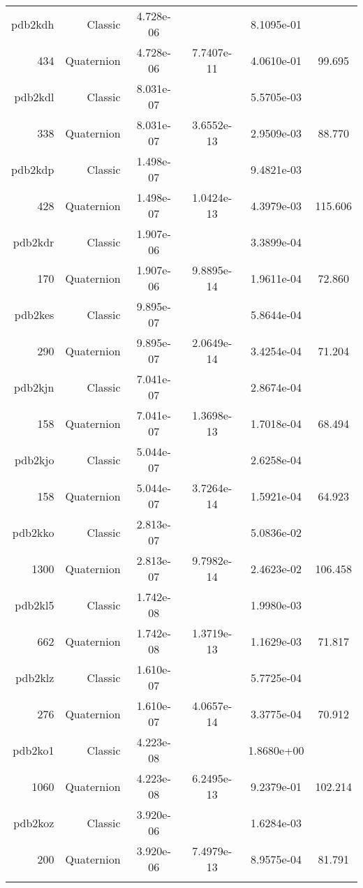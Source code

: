 \begin{xltabular}{\textwidth}{r|rS[table-format=1.3e+2]S[table-format=1.4e+2]S[table-format=1.4e+2]S[table-format=-1.3]}
pdb2kdh & Classic & 4.728e-06 &  & 8.1095e-01 & \\
434 & Quaternion & 4.728e-06 & 7.7407e-11 & 4.0610e-01 & 99.695\\  \addlinespace
pdb2kdl & Classic & 8.031e-07 &  & 5.5705e-03 & \\
338 & Quaternion & 8.031e-07 & 3.6552e-13 & 2.9509e-03 & 88.770\\  \addlinespace
pdb2kdp & Classic & 1.498e-07 &  & 9.4821e-03 & \\
428 & Quaternion & 1.498e-07 & 1.0424e-13 & 4.3979e-03 & 115.606\\  \addlinespace
pdb2kdr & Classic & 1.907e-06 &  & 3.3899e-04 & \\
170 & Quaternion & 1.907e-06 & 9.8895e-14 & 1.9611e-04 & 72.860\\  \addlinespace
pdb2kes & Classic & 9.895e-07 &  & 5.8644e-04 & \\
290 & Quaternion & 9.895e-07 & 2.0649e-14 & 3.4254e-04 & 71.204\\  \addlinespace
pdb2kjn & Classic & 7.041e-07 &  & 2.8674e-04 & \\
158 & Quaternion & 7.041e-07 & 1.3698e-13 & 1.7018e-04 & 68.494\\  \addlinespace
pdb2kjo & Classic & 5.044e-07 &  & 2.6258e-04 & \\
158 & Quaternion & 5.044e-07 & 3.7264e-14 & 1.5921e-04 & 64.923\\  \addlinespace
pdb2kko & Classic & 2.813e-07 &  & 5.0836e-02 & \\
1300 & Quaternion & 2.813e-07 & 9.7982e-14 & 2.4623e-02 & 106.458\\  \addlinespace
pdb2kl5 & Classic & 1.742e-08 &  & 1.9980e-03 & \\
662 & Quaternion & 1.742e-08 & 1.3719e-13 & 1.1629e-03 & 71.817\\  \addlinespace
pdb2klz & Classic & 1.610e-07 &  & 5.7725e-04 & \\
276 & Quaternion & 1.610e-07 & 4.0657e-14 & 3.3775e-04 & 70.912\\  \addlinespace
pdb2ko1 & Classic & 4.223e-08 &  & 1.8680e+00 & \\
1060 & Quaternion & 4.223e-08 & 6.2495e-13 & 9.2379e-01 & 102.214\\  \addlinespace
pdb2koz & Classic & 3.920e-06 &  & 1.6284e-03 & \\
200 & Quaternion & 3.920e-06 & 7.4979e-13 & 8.9575e-04 & 81.791\\  \addlinespace

\end{xltabular}
